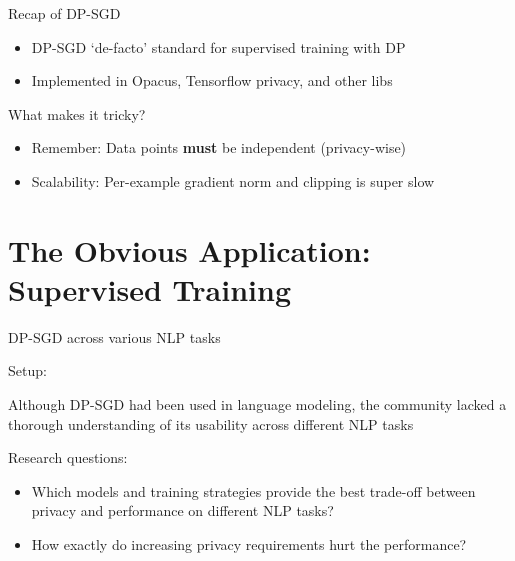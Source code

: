 \documentclass[12pt,aspectratio=169,handout]{beamer}
\begin{document}
\begin{frame}{Recap of DP-SGD}

\begin{itemize}
\item DP-SGD `de-facto' standard for supervised training with DP
\item Implemented in Opacus, Tensorflow privacy, and other libs
\end{itemize}

What makes it tricky?

\begin{itemize}
\item Remember: Data points \textbf{must} be independent (privacy-wise)
\item Scalability: Per-example gradient norm and clipping is super slow
\end{itemize}



\end{frame}


\section{The Obvious Application: Supervised Training}

\begin{frame}{DP-SGD across various NLP tasks}

Setup:

Although DP-SGD had been used in language modeling, the community lacked a thorough understanding of its usability across different NLP tasks

Research questions:

\begin{itemize}
\item Which models and training strategies provide the best trade-off between privacy and performance on different NLP tasks?
\item How exactly do increasing privacy requirements hurt the performance?
\end{itemize}



\end{frame}
\end{document}
